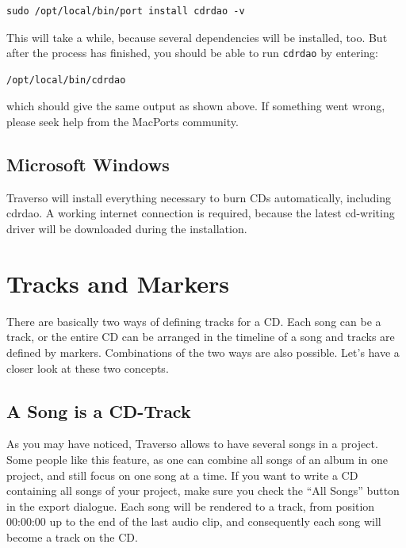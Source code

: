 \begin{verbatim}
sudo /opt/local/bin/port install cdrdao -v
\end{verbatim}
This will take a while, because several dependencies will be installed, too. But after the process has finished, you should be able to run \texttt{cdrdao} by entering:

\begin{verbatim}
/opt/local/bin/cdrdao
\end{verbatim}
which should give the same output as shown above. If something went wrong, please seek help from the MacPorts community.

\subsection{Microsoft Windows}
Traverso will install everything necessary to burn CDs automatically, including cdrdao. A working internet connection is required, because the latest cd-writing driver will be downloaded during the installation.

\section{Tracks and Markers}
There are basically two ways of defining tracks for a CD. Each song can be a track, or the entire CD can be arranged in the timeline of a song and tracks are defined by markers. Combinations of the two ways are also possible. Let's have a closer look at these two concepts.

\subsection{A Song is a CD-Track}
As you may have noticed, Traverso allows to have several songs in a project. Some people like this feature, as one can combine all songs of an album in one project, and still focus on one song at a time. If you want to write a CD containing all songs of your project, make sure you check the ``All Songs'' button in the export dialogue. Each song will be rendered to a track, from position 00:00:00 up to the end of the last audio clip, and consequently each song will become a track on the CD.

